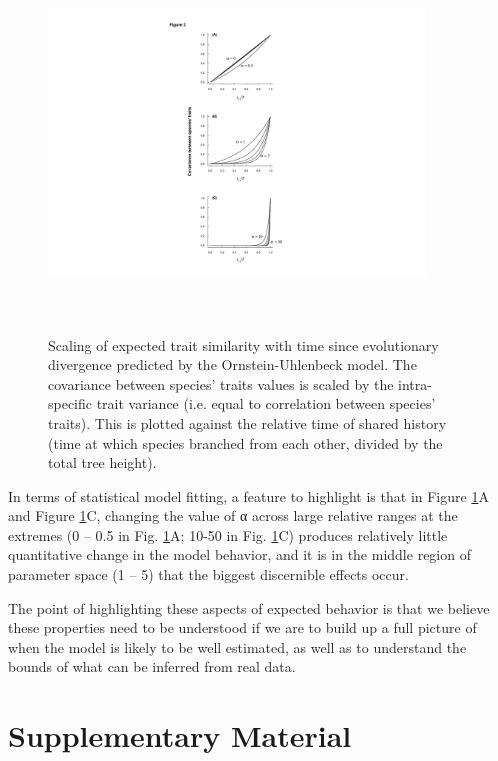 \documentclass[a4paper,12pt]{article}
\begin{document}
\begin{figure}
\centering
    \includegraphics[width=10cm, height=10cm, keepaspectratio=true]{Figures/OU_figure2.pdf}
\caption{Scaling of expected trait similarity with time since evolutionary divergence predicted by the Ornstein-Uhlenbeck model. The covariance between species’ traits values is scaled by the intra-specific trait variance (i.e. equal to correlation between species’ traits). This is plotted against the relative time of shared history (time at which species branched from each other, divided by the total tree height). }
\label{figure.traitsim}
\end{figure}

In terms of statistical model fitting, a feature to highlight is that in Figure \ref{figure.traitsim}A and Figure \ref{figure.traitsim}C, changing the value of α across large relative ranges at the extremes (0 – 0.5 in Fig. \ref{figure.traitsim}A; 10-50 in Fig. \ref{figure.traitsim}C) produces relatively little quantitative change in the model behavior, and it is in the middle region of parameter space (1 – 5) that the biggest discernible effects occur.

The point of highlighting these aspects of expected behavior is that we believe these properties need to be understood if we are to build up a full picture of when the model is likely to be well estimated, as well as to understand the bounds of what can be inferred from real data. 

\section{Supplementary Material}
\end{document}

